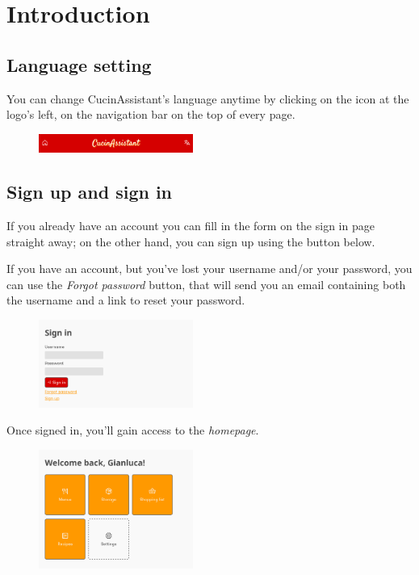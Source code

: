\documentclass[12pt, a4paper]{article}
\begin{document}
    \section{Introduction}

    \subsection{Language setting}

    You can change CucinAssistant's language anytime by clicking on the icon at
    the logo's left, on the navigation bar on the top of every page.

    \begin{figure}[H]
        \centering
        \includegraphics[width=0.45\textwidth]{assets/nav.png}
    \end{figure}

    \subsection{Sign up and sign in}

    If you already have an account you can fill in the form on the sign in page
    straight away; on the other hand, you can sign up using the button below.

    If you have an account, but you've lost your username and/or your password,
    you can use the \emph{Forgot password} button, that will send you an
    email containing both the username and a link to reset your password.

    \begin{figure}[H]
        \centering
        \includegraphics[width=0.45\textwidth]{assets/en/signin.png}
    \end{figure}

    Once signed in, you'll gain access to the \emph{homepage}.

    \begin{figure}[H]
        \centering
        \includegraphics[width=0.45\textwidth]{assets/en/home.png}
    \end{figure}
\end{document}

